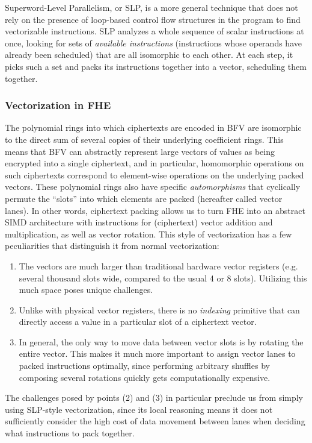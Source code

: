 Superword-Level Parallelism, or SLP, is a more general technique that does not rely on the presence of loop-based control flow structures in the program to find vectorizable instructions.
SLP analyzes a whole sequence of scalar instructions at once, looking for sets of {\em available instructions} (instructions whose operands have already been scheduled) that are all isomorphic to each other.
At each step, it picks such a set and packs its instructions together into a vector, scheduling them together.

\subsubsection*{Vectorization in FHE}
The polynomial rings into which ciphertexts are encoded in BFV are isomorphic to the direct sum of several copies of their underlying coefficient rings.
This means that BFV can abstractly represent large vectors of values as being encrypted into a single ciphertext, and in particular, homomorphic operations on such ciphertexts correspond to element-wise operations on the underlying packed vectors.
These polynomial rings also have specific {\em automorphisms} that cyclically permute the ``slots'' into which elements are packed (hereafter called vector lanes). 
In other words, ciphertext packing allows us to turn FHE into an abstract SIMD architecture with instructions for (ciphertext) vector addition and multiplication, as well as vector rotation.
This style of vectorization has a few peculiarities that distinguish it from normal vectorization:
\begin{enumerate}
    \item The vectors are much larger than traditional hardware vector registers (e.g. several thousand slots wide, compared to the usual 4 or 8 slots). Utilizing this much space poses unique challenges.
    \item Unlike with physical vector registers, there is no {\em indexing} primitive that can directly access a value in a particular slot of a ciphertext vector.
    \item In general, the only way to move data between vector slots is by rotating the entire vector. This makes it much more important to assign vector lanes to packed instructions optimally, since performing arbitrary shuffles by composing several rotations quickly gets computationally expensive.
\end{enumerate}
The challenges posed by points (2) and (3) in particular preclude us from simply using SLP-style vectorization, since its local reasoning means it does not sufficiently consider the high cost of data movement between lanes when deciding what instructions to pack together. %

